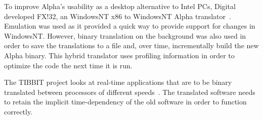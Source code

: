 To improve Alpha's usability as a desktop alternative to Intel
PCs, Digital developed FX!32, an WindowsNT x86 to WindowsNT Alpha
translator~\cite{Thom96,Hook97}.  Emulation was used as it provided
a quick way to provide support for changes in WindowsNT.  However,
binary translation on the background was also used in order to
save the translations to a file and, over time, incrementally
build the new Alpha binary.  This hybrid translator uses profiling
information in order to optimize the code the next time it
is run.

The TIBBIT project looks at real-time applications that are to be
binary translated between processors of different speeds~\cite{Cogs95,Cogs95b}.
The translated software needs to retain the implicit time-dependency
of the old software in order to function correctly.

